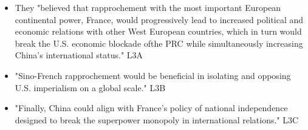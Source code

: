 \documentclass[letterpaper]{article}
\begin{document}
\begin{itemize}
\begin{itemize}
\item They "believed that rapprochement with the most important European
continental power, France, would progressively lead to increased
political and economic relations with other West European countries,
which in turn would break the U.S. economic blockade ofthe PRC while
simultaneously increasing China's international status." L3A
\item "Sino-French rapprochement would be beneficial in isolating and
opposing U.S. imperialism on a global scale." L3B
\item "Finally, China could align with France's policy of national
independence designed to break the superpower monopoly in
international relations." L3C
\end{itemize}


\end{itemize}
\end{document}
